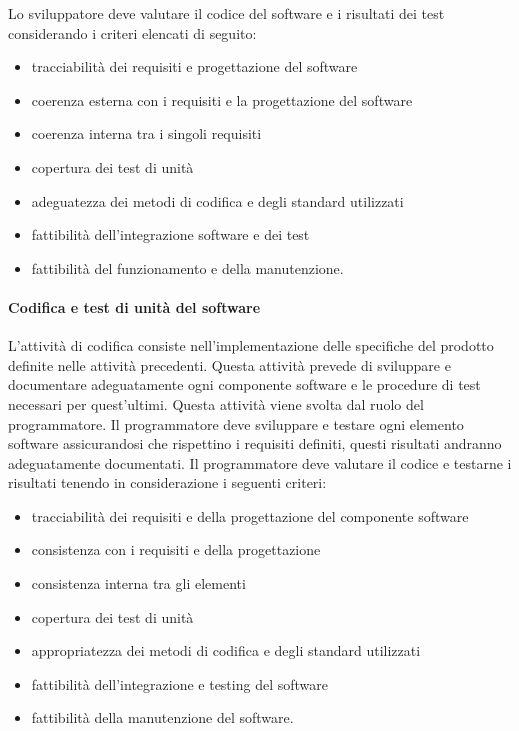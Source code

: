 \documentclass[../../norme-di-progetto.tex]{subfiles}
\begin{document}
Lo sviluppatore deve valutare il codice del software e i risultati dei test considerando i criteri elencati di seguito:

\begin{itemize}
  \item tracciabilità dei requisiti e progettazione del software
  \item coerenza esterna con i requisiti e la progettazione del software
  \item coerenza interna tra i singoli requisiti
  \item copertura dei test di unità
  \item adeguatezza dei metodi di codifica e degli standard utilizzati
  \item fattibilità dell'integrazione software e dei test
  \item fattibilità del funzionamento e della manutenzione.
\end{itemize}

\paragraph{Codifica e test di unità del software}%
\label{par:codifica_test_software}
L'attività di codifica consiste nell'implementazione delle specifiche del prodotto definite nelle attività precedenti.
Questa attività prevede di sviluppare e documentare adeguatamente ogni componente software e le procedure di test necessari per quest'ultimi.
Questa attività viene svolta dal ruolo del programmatore.
Il programmatore deve sviluppare e testare ogni elemento software assicurandosi che rispettino i requisiti definiti, questi risultati andranno adeguatamente documentati.
Il programmatore deve valutare il codice e testarne i risultati tenendo in considerazione i seguenti criteri:
\begin{itemize}
  \item tracciabilità dei requisiti e della progettazione del componente software
  \item consistenza con i requisiti e della progettazione
  \item consistenza interna tra gli elementi
  \item copertura dei test di unità
  \item appropriatezza dei metodi di codifica e degli standard utilizzati
  \item fattibilità dell'integrazione e testing del software
  \item fattibilità della manutenzione del software.
\end{itemize}
\end{document}
